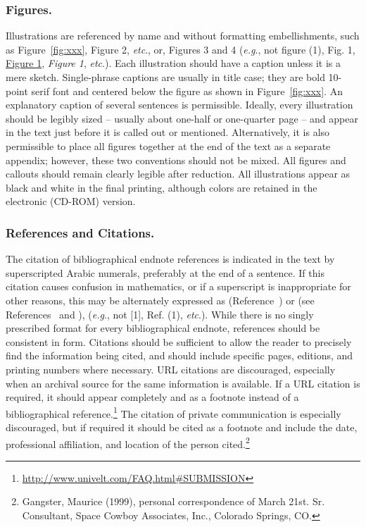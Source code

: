 \documentclass[letterpaper, preprint, paper,11pt]{AAS}	%
\begin{document}
\subsubsection{Figures.}   
Illustrations are referenced by name and without formatting embellishments, such as Figure~\ref{fig:xxx}, Figure 2, \emph{etc}., or, Figures 3 and 4 (\emph{e.g}., not figure (1), Fig. 1, \underline{Figure 1}, \emph{Figure 1}, \emph{etc}.). Each illustration should have a caption unless it is a mere sketch. Single-phrase captions are usually in title case; they are bold 10-point serif font and centered below the figure as shown in Figure~\ref{fig:xxx}. An explanatory caption of several sentences is permissible. Ideally, every illustration should be legibly sized -- usually about one-half or one-quarter page -- and appear in the text just before it is called out or mentioned. Alternatively, it is also permissible to place all figures together at the end of the text as a separate appendix; however, these two conventions should not be mixed. All figures and callouts should remain clearly legible after reduction. All illustrations appear as black and white in the final printing, although colors are retained in the electronic (CD-ROM) version.

\subsubsection{References and Citations.} 
The citation of bibliographical endnote references is indicated in the text by superscripted Arabic numerals, preferably at the end of a sentence.\cite{doe2005, style1959}   If this citation causes confusion in mathematics, or if a superscript is inappropriate for other reasons, this may be alternately expressed as (Reference~) or (see References~ and ), (\emph{e.g}., not [1], Ref. (1), \emph{etc}.). While there is no singly prescribed format for every bibliographical endnote, references should be consistent in form. Citations should be sufficient to allow the reader to precisely find the information being cited, and should include specific pages, editions, and printing numbers where necessary. URL citations are discouraged, especially when an archival source for the same information is available. If a URL citation is required, it should appear completely and as a footnote instead of a bibliographical reference.\footnote{\url{http://www.univelt.com/FAQ.html\#SUBMISSION}}  The citation of private communication is especially discouraged, but if required it should be cited as a footnote and include the date, professional affiliation, and location of the person cited.\footnote{Gangster, Maurice (1999), personal correspondence of March 21st. Sr. Consultant, Space Cowboy Associates, Inc., Colorado Springs, CO.}  
\end{document}
